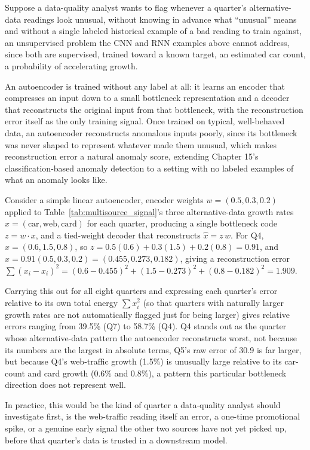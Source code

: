 \documentclass[../ai_in_finance]{subfiles}
\begin{document}
Suppose a data-quality analyst wants to flag whenever a quarter's alternative-data readings look unusual, without knowing in advance what ``unusual'' means and without a single labeled historical example of a bad reading to train against, an unsupervised problem the CNN and RNN examples above cannot address, since both are supervised, trained toward a known target, an estimated car count, a probability of accelerating growth.

An autoencoder is trained without any label at all: it learns an encoder that compresses an input down to a small bottleneck representation and a decoder that reconstructs the original input from that bottleneck, with the reconstruction error itself as the only training signal. Once trained on typical, well-behaved data, an autoencoder reconstructs anomalous inputs poorly, since its bottleneck was never shaped to represent whatever made them unusual, which makes reconstruction error a natural anomaly score, extending Chapter 15's classification-based anomaly detection to a setting with no labeled examples of what an anomaly looks like.

Consider a simple linear autoencoder, encoder weights $w = (0.5, 0.3, 0.2)$ applied to Table~\ref{tab:multisource_signal}'s three alternative-data growth rates $x = (\text{car}, \text{web}, \text{card})$ for each quarter, producing a single bottleneck code $z = w \cdot x$, and a tied-weight decoder that reconstructs $\hat x = z\, w$. For Q4, $x = (0.6, 1.5, 0.8)$, so $z = 0.5(0.6) + 0.3(1.5) + 0.2(0.8) = 0.91$, and $\hat x = 0.91(0.5, 0.3, 0.2) = (0.455, 0.273, 0.182)$, giving a reconstruction error $\sum(x_i - \hat x_i)^2 = (0.6-0.455)^2 + (1.5-0.273)^2 + (0.8-0.182)^2 = 1.909$.

Carrying this out for all eight quarters and expressing each quarter's error relative to its own total energy $\sum x_i^2$ (so that quarters with naturally larger growth rates are not automatically flagged just for being larger) gives relative errors ranging from 39.5\% (Q7) to 58.7\% (Q4). Q4 stands out as the quarter whose alternative-data pattern the autoencoder reconstructs worst, not because its numbers are the largest in absolute terms, Q5's raw error of 30.9 is far larger, but because Q4's web-traffic growth (1.5\%) is unusually large relative to its car-count and card growth (0.6\% and 0.8\%), a pattern this particular bottleneck direction does not represent well.

In practice, this would be the kind of quarter a data-quality analyst should investigate first, is the web-traffic reading itself an error, a one-time promotional spike, or a genuine early signal the other two sources have not yet picked up, before that quarter's data is trusted in a downstream model.
\end{document}
